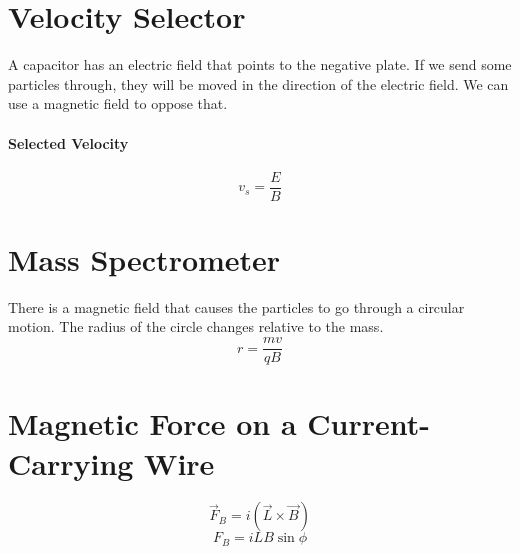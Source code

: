 \documentclass{article}
\begin{document}
    \section{Velocity Selector}

        A capacitor has an electric field that points to the negative plate. If we send some particles through, they will be moved in the direction of the electric field. We can use a magnetic field to oppose that.

        \paragraph{Selected Velocity}
        \begin{equation}
            v_s = \frac{E}{B}
        \end{equation}

    \section{Mass Spectrometer}

        There is a magnetic field that causes the particles to go through a circular motion. The radius of the circle changes relative to the mass.
        \begin{equation}
            r = \frac{m v}{q B}
        \end{equation}

    \section{Magnetic Force on a Current-Carrying Wire}

        \begin{equation}
            \vec{F}_B = i \left(\vec{L} \times \vec{B} \right)
        \end{equation}
        \begin{equation}
            F_B = i L B \sin{\phi}
        \end{equation}
\end{document}
